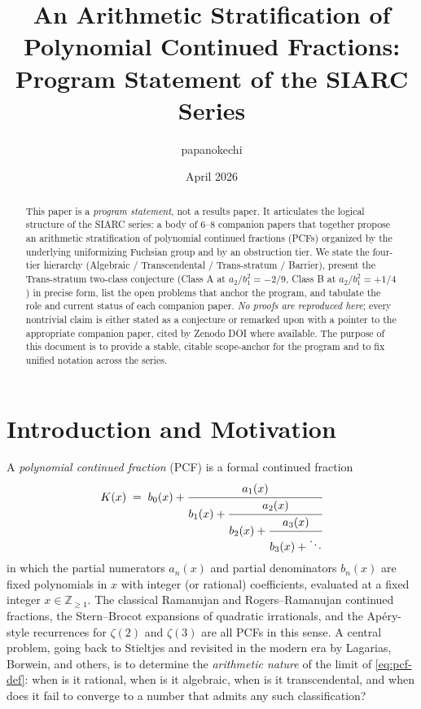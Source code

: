 \documentclass[11pt,a4paper]{article}
\title{An Arithmetic Stratification of Polynomial Continued Fractions:\\
       Program Statement of the SIARC Series}
\author{papanokechi}
\date{April 2026}
\theoremstyle{definition}
\theoremstyle{remark}
\newcommand{\Z}{\mathbb{Z}}
\begin{document}
\maketitle

\begin{abstract}
This paper is a \emph{program statement}, not a results paper. It articulates
the logical structure of the SIARC series: a body of $6$--$8$ companion papers
that together propose an arithmetic stratification of polynomial continued
fractions (PCFs) organized by the underlying uniformizing Fuchsian group and
by an obstruction tier. We state the four-tier hierarchy
(Algebraic / Transcendental / Trans-stratum / Barrier), present the
Trans-stratum two-class conjecture (Class A at $a_2/b_1^2 = -2/9$,
Class B at $a_2/b_1^2 = +1/4$) in precise form, list the open problems
that anchor the program, and tabulate the role and current status of each
companion paper. \emph{No proofs are reproduced here}; every nontrivial
claim is either stated as a conjecture or remarked upon with a pointer to
the appropriate companion paper, cited by Zenodo DOI where available. The
purpose of this document is to provide a stable, citable scope-anchor for
the program and to fix unified notation across the series.
\end{abstract}

\tableofcontents

\section{Introduction and Motivation}
\label{sec:intro}

A \emph{polynomial continued fraction} (PCF) is a formal continued fraction
\begin{equation}
  \label{eq:pcf-def}
  K(x) \;=\; b_0(x) + \cfrac{a_1(x)}{b_1(x) + \cfrac{a_2(x)}{b_2(x) + \cfrac{a_3(x)}{b_3(x) + \ddots}}}
\end{equation}
in which the partial numerators $a_n(x)$ and partial denominators $b_n(x)$
are fixed polynomials in $x$ with integer (or rational) coefficients, evaluated
at a fixed integer $x \in \Z_{\geq 1}$. The classical Ramanujan and
Rogers--Ramanujan continued fractions, the Stern--Brocot expansions of
quadratic irrationals, and the Apéry-style recurrences for $\zeta(2)$ and
$\zeta(3)$ are all PCFs in this sense. A central problem, going back to
Stieltjes and revisited in the modern era by Lagarias, Borwein, and others,
is to determine the \emph{arithmetic nature} of the limit of \eqref{eq:pcf-def}:
when is it rational, when is it algebraic, when is it transcendental, and
when does it fail to converge to a number that admits any such classification?
\end{document}
